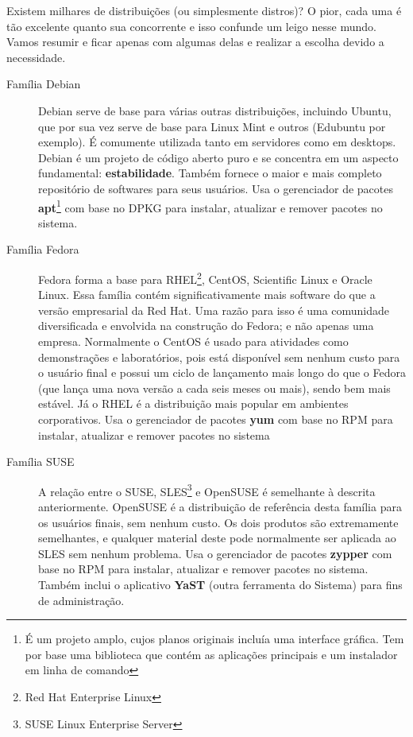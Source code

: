 Existem milhares de distribuições (ou simplesmente distros)? O pior, cada uma é tão excelente quanto sua concorrente e isso confunde um leigo nesse mundo. Vamos resumir e ficar apenas com algumas delas e realizar a escolha devido a necessidade.
\begin{description}
 \item[Família Debian] Debian serve de base para várias outras distribuições, incluindo Ubuntu, que por sua vez serve de base para Linux Mint e outros (Edubuntu por exemplo). É comumente utilizada tanto em servidores como em desktops. Debian é um projeto de código aberto puro e se concentra em um aspecto fundamental: \textbf{estabilidade}. Também fornece o maior e mais completo repositório de softwares para seus usuários. Usa o gerenciador de pacotes \textbf{apt}\footnote{É um projeto amplo, cujos planos originais incluía uma interface gráfica. Tem por base uma biblioteca que contém as aplicações principais e um instalador em linha de comando} com base no DPKG para instalar, atualizar e remover pacotes no sistema.
 \item[Família Fedora] Fedora forma a base para RHEL\footnote{Red Hat Enterprise Linux}, CentOS, Scientific Linux e Oracle Linux. Essa família contém significativamente mais software do que a versão empresarial da Red Hat. Uma razão para isso é uma comunidade diversificada e envolvida na construção do Fedora; e não apenas uma empresa. Normalmente o CentOS é usado para atividades como demonstrações e laboratórios, pois está disponível sem nenhum custo para o usuário final e possui um ciclo de lançamento mais longo do que o Fedora (que lança uma nova versão a cada seis meses ou mais), sendo bem mais estável. Já o RHEL é a distribuição mais popular em ambientes corporativos. Usa o gerenciador de pacotes \textbf{yum} com base no RPM para instalar, atualizar e remover pacotes no sistema
 \item[Família SUSE] A relação entre o SUSE, SLES\footnote{SUSE Linux Enterprise Server} e OpenSUSE é semelhante à descrita anteriormente. OpenSUSE é a distribuição de referência desta família para os usuários finais, sem nenhum custo. Os dois produtos são extremamente semelhantes, e qualquer material deste pode normalmente ser aplicada ao SLES sem nenhum problema. Usa o gerenciador de pacotes \textbf{zypper} com base no  RPM para instalar, atualizar e remover pacotes no sistema. Também inclui o aplicativo \textbf{YaST} (outra ferramenta do Sistema) para fins de administração.
\end{description}

